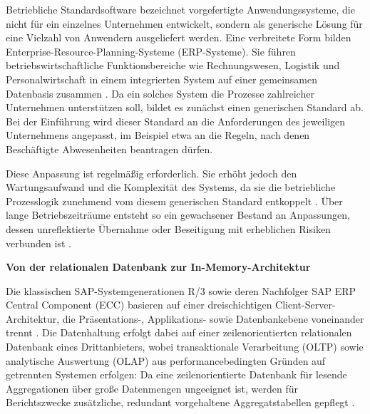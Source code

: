 Betriebliche Standardsoftware bezeichnet vorgefertigte Anwendungssysteme, die nicht für ein einzelnes Unternehmen entwickelt, sondern als generische Lösung für eine Vielzahl von Anwendern ausgeliefert werden. Eine verbreitete Form bilden Enterprise-Resource-Planning-Systeme (ERP-Systeme). Sie führen betriebswirtschaftliche Funktionsbereiche wie Rechnungswesen, Logistik und Personalwirtschaft in einem integrierten System auf einer gemeinsamen Datenbasis zusammen \cite{klaus_what_2000}. Da ein solches System die Prozesse zahlreicher Unternehmen unterstützen soll, bildet es zunächst einen generischen Standard ab. Bei der Einführung wird dieser Standard an die Anforderungen des jeweiligen Unternehmens angepasst, im Beispiel etwa an die Regeln, nach denen Beschäftigte Abwesenheiten beantragen dürfen.

Diese Anpassung ist regelmäßig erforderlich. Sie erhöht jedoch den Wartungsaufwand und die Komplexität des Systems, da sie die betriebliche Prozesslogik zunehmend vom diesem generischen Standard entkoppelt \cite{light_maintenance_2001}. Über lange Betriebszeiträume entsteht so ein gewachsener Bestand an Anpassungen, dessen unreflektierte Übernahme oder Beseitigung mit erheblichen Risiken verbunden ist \cite{mhaskey_identifying_2025}.


\textbf{Von der relationalen Datenbank zur In-Memory-Architektur}

Die klassischen SAP-Systemgenerationen R/3 sowie deren Nachfolger SAP ERP Central
Component (ECC) basieren auf einer dreischichtigen Client-Server-Architektur, die
Präsentations-, Applikations- sowie Datenbankebene voneinander trennt
\cite{buck-emden_technologie_1999}. Die Datenhaltung erfolgt dabei auf einer
zeilenorientierten relationalen Datenbank eines Drittanbieters, wobei
transaktionale Verarbeitung (OLTP) sowie analytische Auswertung (OLAP) aus
performancebedingten Gründen auf getrennten Systemen erfolgen: Da eine
zeilenorientierte Datenbank für lesende Aggregationen über große Datenmengen
ungeeignet ist, werden für Berichtszwecke zusätzliche, redundant vorgehaltene
Aggregatstabellen gepflegt \cite{plattner_common_2009}.

